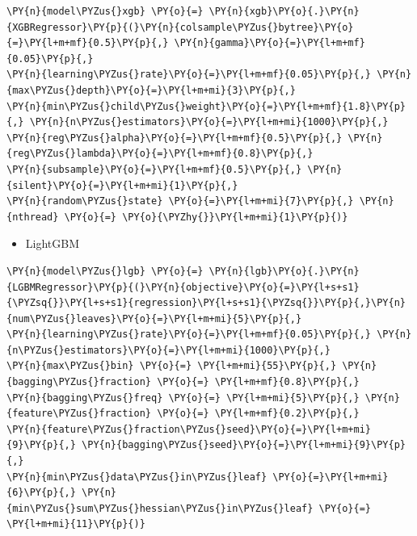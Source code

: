 \documentclass[no-math]{YangThesis}
\begin{document}
\begin{tcolorbox}[breakable, size=fbox, boxrule=1pt, pad at break*=1mm,colback=cellbackground, colframe=cellborder]
	\begin{Verbatim}[commandchars=\\\{\}]
\PY{n}{model\PYZus{}xgb} \PY{o}{=} \PY{n}{xgb}\PY{o}{.}\PY{n}{XGBRegressor}\PY{p}{(}\PY{n}{colsample\PYZus{}bytree}\PY{o}{=}\PY{l+m+mf}{0.5}\PY{p}{,} \PY{n}{gamma}\PY{o}{=}\PY{l+m+mf}{0.05}\PY{p}{,} 
\PY{n}{learning\PYZus{}rate}\PY{o}{=}\PY{l+m+mf}{0.05}\PY{p}{,} \PY{n}{max\PYZus{}depth}\PY{o}{=}\PY{l+m+mi}{3}\PY{p}{,} 
\PY{n}{min\PYZus{}child\PYZus{}weight}\PY{o}{=}\PY{l+m+mf}{1.8}\PY{p}{,} \PY{n}{n\PYZus{}estimators}\PY{o}{=}\PY{l+m+mi}{1000}\PY{p}{,}
\PY{n}{reg\PYZus{}alpha}\PY{o}{=}\PY{l+m+mf}{0.5}\PY{p}{,} \PY{n}{reg\PYZus{}lambda}\PY{o}{=}\PY{l+m+mf}{0.8}\PY{p}{,}
\PY{n}{subsample}\PY{o}{=}\PY{l+m+mf}{0.5}\PY{p}{,} \PY{n}{silent}\PY{o}{=}\PY{l+m+mi}{1}\PY{p}{,}
\PY{n}{random\PYZus{}state} \PY{o}{=}\PY{l+m+mi}{7}\PY{p}{,} \PY{n}{nthread} \PY{o}{=} \PY{o}{\PYZhy{}}\PY{l+m+mi}{1}\PY{p}{)}
	\end{Verbatim}
\end{tcolorbox}

\begin{itemize}
	\tightlist
	\item
	LightGBM
\end{itemize}

\begin{tcolorbox}[breakable, size=fbox, boxrule=1pt, pad at break*=1mm,colback=cellbackground, colframe=cellborder]
	\begin{Verbatim}[commandchars=\\\{\}]
\PY{n}{model\PYZus{}lgb} \PY{o}{=} \PY{n}{lgb}\PY{o}{.}\PY{n}{LGBMRegressor}\PY{p}{(}\PY{n}{objective}\PY{o}{=}\PY{l+s+s1}{\PYZsq{}}\PY{l+s+s1}{regression}\PY{l+s+s1}{\PYZsq{}}\PY{p}{,}\PY{n}{num\PYZus{}leaves}\PY{o}{=}\PY{l+m+mi}{5}\PY{p}{,}
\PY{n}{learning\PYZus{}rate}\PY{o}{=}\PY{l+m+mf}{0.05}\PY{p}{,} \PY{n}{n\PYZus{}estimators}\PY{o}{=}\PY{l+m+mi}{1000}\PY{p}{,}
\PY{n}{max\PYZus{}bin} \PY{o}{=} \PY{l+m+mi}{55}\PY{p}{,} \PY{n}{bagging\PYZus{}fraction} \PY{o}{=} \PY{l+m+mf}{0.8}\PY{p}{,}
\PY{n}{bagging\PYZus{}freq} \PY{o}{=} \PY{l+m+mi}{5}\PY{p}{,} \PY{n}{feature\PYZus{}fraction} \PY{o}{=} \PY{l+m+mf}{0.2}\PY{p}{,}
\PY{n}{feature\PYZus{}fraction\PYZus{}seed}\PY{o}{=}\PY{l+m+mi}{9}\PY{p}{,} \PY{n}{bagging\PYZus{}seed}\PY{o}{=}\PY{l+m+mi}{9}\PY{p}{,}
\PY{n}{min\PYZus{}data\PYZus{}in\PYZus{}leaf} \PY{o}{=}\PY{l+m+mi}{6}\PY{p}{,} \PY{n}{min\PYZus{}sum\PYZus{}hessian\PYZus{}in\PYZus{}leaf} \PY{o}{=} \PY{l+m+mi}{11}\PY{p}{)}
	\end{Verbatim}
\end{tcolorbox}
\end{document}
